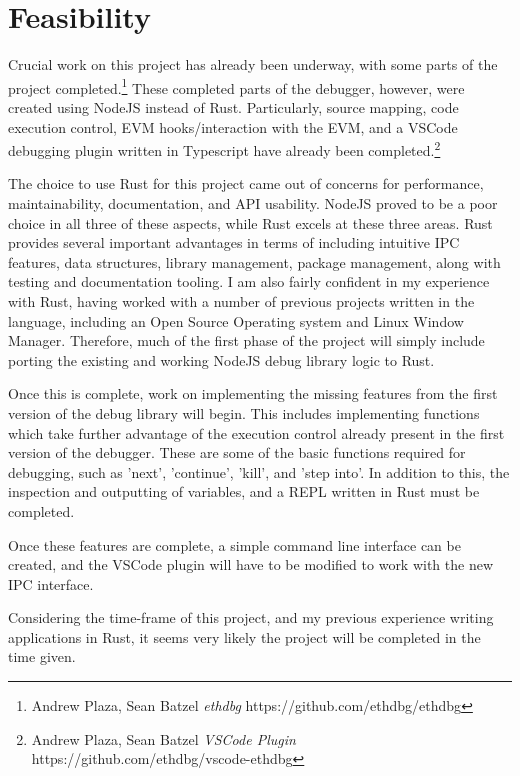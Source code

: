 \documentclass[]{article}
\begin{document}
\section{Feasibility}
Crucial work on this project has already been underway, with some parts of the project completed.\footnote{Andrew Plaza, Sean Batzel \textit{ethdbg} https://github.com/ethdbg/ethdbg} These completed parts of the debugger, however, were created using NodeJS instead of Rust. Particularly, source mapping, code execution control, EVM hooks/interaction with the EVM, and a VSCode debugging plugin written in Typescript have already been completed.\footnote{Andrew Plaza, Sean Batzel \textit{VSCode Plugin} https://github.com/ethdbg/vscode-ethdbg}

The choice to use Rust for this project came out of concerns for performance, maintainability, documentation, and API usability. NodeJS proved to be a poor choice in all three of these aspects, while Rust excels at these three areas. Rust provides several important advantages in terms of including intuitive IPC features, data structures, library management, package management, along with testing and documentation tooling. I am also fairly confident in my experience with Rust, having worked with a number of previous projects written in the language, including an Open Source Operating system and Linux Window Manager. Therefore, much of the first phase of the project will simply include porting the existing and working NodeJS debug library logic to Rust.

Once this is complete, work on implementing the missing features from the first version of the debug library will begin. This includes implementing functions which take further advantage of the execution control already present in the first version of the debugger. These are some of the basic functions required for debugging, such as 'next', 'continue', 'kill', and 'step into'. In addition to this, the inspection and outputting of variables, and a REPL written in Rust must be completed.

Once these features are complete, a simple command line interface can be created, and the VSCode plugin will have to be modified to work with the new IPC interface.

Considering the time-frame of this project, and my previous experience writing applications in Rust, it seems very likely the project will be completed in the time given.
 
\end{document}
